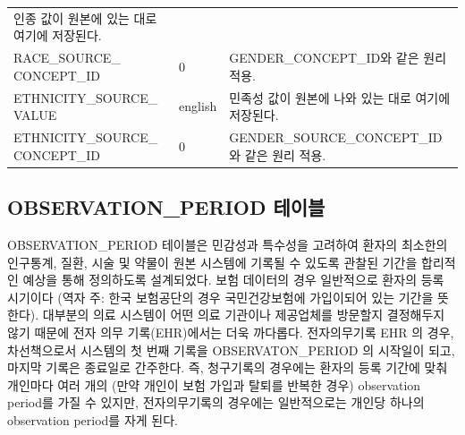 \documentclass[10.5pt]{book}
\theoremstyle{definition}
\theoremstyle{definition}
\theoremstyle{definition}
\theoremstyle{remark}
\begin{document}
\begin{longtable}[]{@{}lll@{}}
\begin{minipage}[t]{0.48\columnwidth}
인종 값이 원본에 있는 대로 여기에 저장된다.\strut
\end{minipage}\tabularnewline
\begin{minipage}[t]{0.28\columnwidth}\raggedright\strut
RACE\_SOURCE\_ CONCEPT\_ID\strut
\end{minipage} & \begin{minipage}[t]{0.16\columnwidth}\raggedright\strut
0\strut
\end{minipage} & \begin{minipage}[t]{0.48\columnwidth}\raggedright\strut
GENDER\_CONCEPT\_ID와 같은 원리 적용.\strut
\end{minipage}\tabularnewline
\begin{minipage}[t]{0.28\columnwidth}\raggedright\strut
ETHNICITY\_SOURCE\_ VALUE\strut
\end{minipage} & \begin{minipage}[t]{0.16\columnwidth}\raggedright\strut
english\strut
\end{minipage} & \begin{minipage}[t]{0.48\columnwidth}\raggedright\strut
민족성 값이 원본에 나와 있는 대로 여기에 저장된다.\strut
\end{minipage}\tabularnewline
\begin{minipage}[t]{0.28\columnwidth}\raggedright\strut
ETHNICITY\_SOURCE\_ CONCEPT\_ID\strut
\end{minipage} & \begin{minipage}[t]{0.16\columnwidth}\raggedright\strut
0\strut
\end{minipage} & \begin{minipage}[t]{0.48\columnwidth}\raggedright\strut
GENDER\_SOURCE\_CONCEPT\_ID와 같은 원리 적용.\strut
\end{minipage}\tabularnewline
\bottomrule
\end{longtable}

\subsection{OBSERVATION\_PERIOD 테이블}\label{observationPeriod}

OBSERVATION\_PERIOD 테이블은 민감성과 특수성을 고려하여 환자의 최소한의
인구통계, 질환, 시술 및 약물이 원본 시스템에 기록될 수 있도록 관찰된
기간을 합리적인 예상을 통해 정의하도록 설계되었다. 보험 데이터의 경우
일반적으로 환자의 등록 시기이다 (역자 주: 한국 보험공단의 경우
국민건강보험에 가입이되어 있는 기간을 뜻한다). 대부분의 의료 시스템이
어떤 의료 기관이나 제공업체를 방문할지 결정해두지 않기 때문에 전자 의무
기록(EHR)에서는 더욱 까다롭다. 전자의무기록 EHR 의 경우, 차선책으로서
시스템의 첫 번째 기록을 OBSERVATON\_PERIOD 의 시작일이 되고, 마지막
기록은 종료일로 간주한다. 즉, 청구기록의 경우에는 환자의 등록 기간에
맞춰 개인마다 여러 개의 (만약 개인이 보험 가입과 탈퇴를 반복한 경우)
observation period를 가질 수 있지만, 전자의무기록의 경우에는
일반적으로는 개인당 하나의 observation period를 자게 된다.
\end{document}

